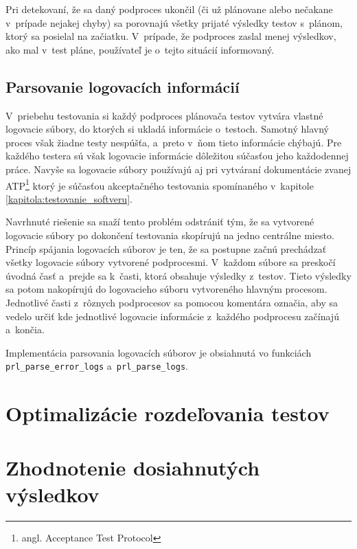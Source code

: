 Pri detekovaní, že sa daný podproces ukončil (či už plánovane alebo nečakane v~prípade
nejakej chyby) sa porovnajú všetky prijaté výsledky testov s~plánom, ktorý sa posielal na
začiatku. V~prípade, že podproces zaslal menej výsledkov, ako mal v~test pláne,
používateľ je o~tejto situácií informovaný. 

\section{Parsovanie logovacích informácií}
\label{sekcia:parsovanie_logov}
V~priebehu testovania si každý podproces plánovača testov vytvára vlastné
logovacie súbory, do ktorých si ukladá informácie o~testoch.
Samotný hlavný proces však žiadne testy nespúšťa, a~preto v~ňom tieto informácie
chýbajú. Pre každého testera sú však logovacie informácie dôležitou súčasťou jeho
každodennej práce. Navyše sa logovacie súbory používajú aj pri vytváraní
dokumentácie zvanej ATP\footnote{angl. Acceptance Test Protocol} ktorý je súčasťou
akceptačného testovania spomínaného v~kapitole \ref{kapitola:testovanie_softveru}.

Navrhnuté riešenie sa snaží tento problém odstrániť tým, že sa vytvorené
logovacie súbory po dokončení testovania skopírujú na jedno centrálne miesto.
Princíp spájania logovacích súborov je ten, že sa postupne začnú prechádzať
všetky logovacie súbory vytvorené podprocesmi. V~každom súbore sa preskočí úvodná časť 
a~prejde sa k~časti, ktorá obsahuje výsledky z~testov. Tieto výsledky sa potom nakopírujú
do logovacieho súboru vytvoreného hlavným procesom. Jednotlivé časti z~rôznych podprocesov
sa pomocou komentára označia, aby sa vedelo určiť kde jednotlivé logovacie informácie
z~každého podprocesu začínajú a~končia.

Implementácia parsovania logovacích súborov je obsiahnutá vo funkciách \texttt{prl\_parse\_error\_logs}
a~\texttt{prl\_parse\_logs}. 
 

%
%
\chapter{Optimalizácie rozdeľovania testov}
\label{kapitola:optimalizacie}




%
%
\chapter{Zhodnotenie dosiahnutých výsledkov}
\label{kapitola:zhodnotenie_vysledkov}

